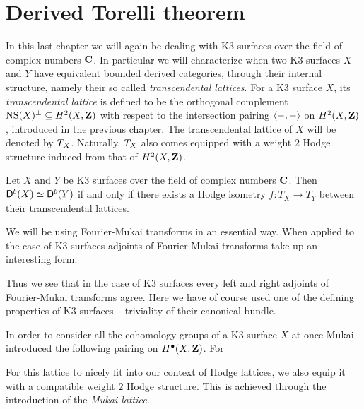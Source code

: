 \section{Derived Torelli theorem}
\label{Chapter: Derived Torelli theorem}


In this last chapter we will again be dealing with K3 surfaces over the field of complex numbers $\mathbf C$. In particular we will characterize when two K3 surfaces $X$ and $Y$ have equivalent bounded derived categories, through their internal structure, namely their so called \emph{transcendental lattices}. For a K3 surface $X$, its \emph{transcendental lattice} is defined to be the orthogonal complement $\operatorname{NS}(X)^\perp \subseteq H^{2}(X, \mathbf Z)$ with respect to the intersection pairing $\langle -, - \rangle$ on $H^{2}(X, \mathbf Z)$, introduced in the previous chapter. The transcendental lattice of $X$ will be denoted by $T_{X}$.
Naturally, $T_{X}$ also comes equipped with a weight $2$ Hodge structure induced from that of $H^{2}(X, \mathbf Z)$. 


\begin{theorem}
    \label{Derived Torelli}
    Let $X$ and $Y$ be K3 surfaces over the field of complex numbers $\mathbf C$. Then $\mathsf{D}^b(X) \simeq \mathsf{D}^b(Y)$ if and only if there exists a Hodge isometry $f\colon T_X \to T_Y$ between their transcendental lattices.
\end{theorem}

We will be using Fourier-Mukai transforms in an essential way. When applied to the case of K3 surfaces adjoints of Fourier-Mukai transforms take up an interesting form.

Thus we see that in the case of K3 surfaces every left and right adjoints of Fourier-Mukai transforms agree.
Here we have of course used one of the defining properties of K3 surfaces -- triviality of their canonical bundle.


In order to consider all the cohomology groups of a K3 surface $X$ at once Mukai introduced the following pairing on $H^{\bullet}(X, \mathbf Z)$. For 

For this lattice to nicely fit into our context of Hodge lattices, we also equip it with a compatible weight $2$ Hodge structure. This is achieved through the introduction of the \emph{Mukai lattice}. 

